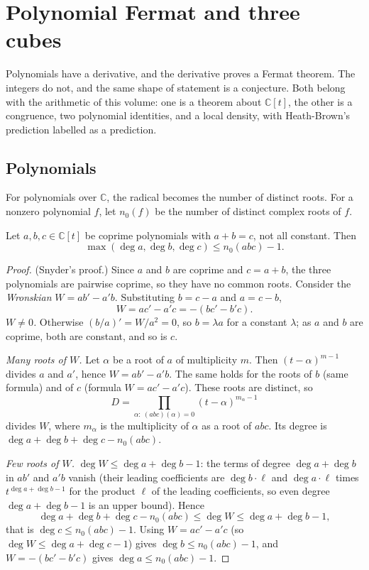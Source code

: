 \chapter{Polynomial Fermat and three cubes}\label{ch:polyfermat}

Polynomials have a derivative, and the derivative proves a Fermat theorem. The integers do not, and the same shape of statement is a conjecture. Both belong with the arithmetic of this volume: one is a theorem about $\mathbb C[t]$, the other is a congruence, two polynomial identities, and a local density, with Heath-Brown's prediction labelled as a prediction.

\section{Polynomials}

For polynomials over $\mathbb C$, the radical becomes the number of distinct roots. For a nonzero polynomial $f$, let $n_0(f)$ be the number of distinct
complex roots of $f$.

\begin{theorem}\label{conjectures:thm:mason}
Let $a,b,c\in\mathbb C[t]$ be coprime polynomials with $a+b=c$, not all constant. Then
\[
\max(\deg a,\deg b,\deg c)\le n_0(abc)-1.
\]
\end{theorem}
\begin{proof}
(Snyder's proof.) Since $a$ and $b$ are coprime and $c=a+b$, the three polynomials are pairwise coprime, so they have no common roots. Consider the
\emph{Wronskian} $W=ab'-a'b$. Substituting $b=c-a$ and $a=c-b$,
\[
W=ac'-a'c=-(bc'-b'c).
\]
\emph{$W\ne0$.} Otherwise $(b/a)'=W/a^2=0$, so $b=\lambda a$ for a constant $\lambda$; as $a$ and $b$ are coprime, both are constant, and so is $c$.

\emph{Many roots of $W$.} Let $\alpha$ be a root of $a$ of multiplicity $m$. Then $(t-\alpha)^{m-1}$ divides $a$ and $a'$, hence $W=ab'-a'b$. The same holds for
the roots of $b$ (same formula) and of $c$ (formula $W=ac'-a'c$). These roots are distinct, so
\[
D=\prod_{\alpha:\ (abc)(\alpha)=0}(t-\alpha)^{m_\alpha-1}
\]
divides $W$, where $m_\alpha$ is the multiplicity of $\alpha$ as a root of $abc$. Its degree is $\deg a+\deg b+\deg c-n_0(abc)$.

\emph{Few roots of $W$.} $\deg W\le\deg a+\deg b-1$: the terms of degree $\deg a+\deg b$ in $ab'$ and $a'b$ vanish (their leading coefficients are
$\deg b\cdot\ell$ and $\deg a\cdot\ell$ times $t^{\deg a+\deg b-1}$ for the product $\ell$ of the leading coefficients, so even degree $\deg a+\deg b-1$ is
an upper bound). Hence
\[
\deg a+\deg b+\deg c-n_0(abc)\le\deg W\le\deg a+\deg b-1,
\]
that is $\deg c\le n_0(abc)-1$. Using $W=ac'-a'c$ (so $\deg W\le\deg a+\deg c-1$) gives $\deg b\le n_0(abc)-1$, and $W=-(bc'-b'c)$ gives
$\deg a\le n_0(abc)-1$.
\end{proof}

